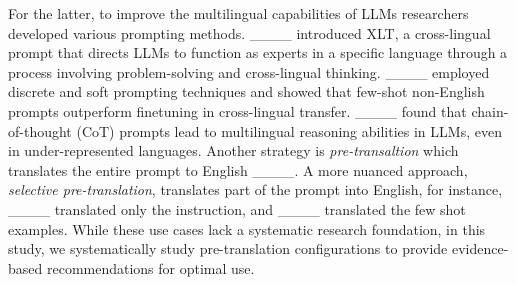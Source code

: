 For the latter, to improve the multilingual capabilities of  LLMs
researchers
  developed various prompting methods. ____ introduced XLT, a cross-lingual prompt that directs LLMs to function as experts in a specific language through a process involving problem-solving and cross-lingual thinking. ____ employed discrete and soft prompting techniques and showed that few-shot non-English prompts outperform finetuning in cross-lingual transfer. ____ found that chain-of-thought (CoT) prompts lead to multilingual reasoning abilities in LLMs, even in under-represented languages. Another strategy is \emph{pre-transaltion} which translates the entire prompt to English ____. A more nuanced approach, \emph{selective pre-translation}, translates part of the prompt into English, for instance, ____ translated only the instruction, and ____ translated the few shot examples. While
these use cases lack a systematic research foundation, in this study, we systematically study pre-translation configurations to provide evidence-based recommendations for optimal use.
